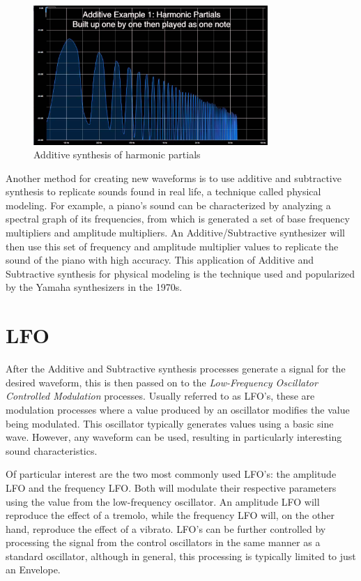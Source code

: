 \documentclass[a4paper,12pt]{report}
\begin{document}
\begin{figure}[h]
    \centering
    \includegraphics[width=24em]{AdditiveSynthesisbyHarmonics.jpg}
    \caption{Additive synthesis of harmonic partials \cite{addsynthbasics}}
    \label{fig:AdditiveSynthesisbyHarmonics}
\end{figure}

Another method for creating new waveforms is to use additive and subtractive synthesis to replicate sounds found in real life, a technique called physical modeling. For example, a piano's sound can be characterized by analyzing a spectral graph of its frequencies, from which is generated a set of base frequency multipliers and amplitude multipliers. An Additive/Subtractive synthesizer will then use this set of frequency and amplitude multiplier values to replicate the sound of the piano with high accuracy. This application of Additive and Subtractive synthesis for physical modeling is the technique used and popularized by the Yamaha synthesizers in the 1970s.

\section{LFO}
\label{sec:lfo}
After the Additive and Subtractive synthesis processes generate a signal for the desired waveform, this is then passed on to the \emph{Low-Frequency Oscillator Controlled Modulation} processes. Usually referred to as LFO's, these are modulation processes where a value produced by an oscillator modifies the value being modulated. This oscillator typically generates values using a basic sine wave. However, any waveform can be used, resulting in particularly interesting sound characteristics.

Of particular interest are the two most commonly used LFO's: the amplitude LFO and the frequency LFO. Both will modulate their respective parameters using the value from the low-frequency oscillator. An amplitude LFO will reproduce the effect of a tremolo, while the frequency LFO will, on the other hand, reproduce the effect of a vibrato. LFO's can be further controlled by processing the signal from the control oscillators in the same manner as a standard oscillator, although in general, this processing is typically limited to just an Envelope.
\end{document}
